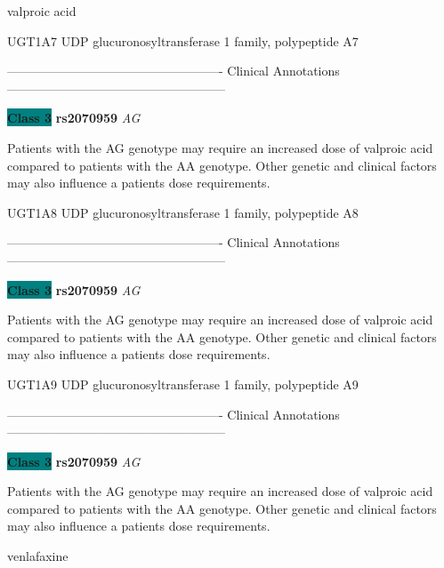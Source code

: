 \documentclass{resume} %
\begin{document}
\begin{rSection}{ valproic acid }
\begin{rSubsection}{ UGT1A7 }{ UDP glucuronosyltransferase 1 family, polypeptide A7 }{}{}
\item[] ---------------------------------------------------- Clinical Annotations -----------------------------------------------------\newline
\item \textbf{\colorbox{teal} {Class 3}} \textbf{ rs2070959 } \textit{ AG }
\item[] Patients with the AG genotype may require an increased dose of valproic acid compared to patients with the AA genotype. Other genetic and clinical factors may also influence a patients dose requirements.
\end{rSubsection}\begin{rSubsection}{ UGT1A8 }{ UDP glucuronosyltransferase 1 family, polypeptide A8 }{}{}
\item[]

\item[] ---------------------------------------------------- Clinical Annotations -----------------------------------------------------\newline
\item \textbf{\colorbox{teal} {Class 3}} \textbf{ rs2070959 } \textit{ AG }
\item[] Patients with the AG genotype may require an increased dose of valproic acid compared to patients with the AA genotype. Other genetic and clinical factors may also influence a patients dose requirements.
\end{rSubsection}\begin{rSubsection}{ UGT1A9 }{ UDP glucuronosyltransferase 1 family, polypeptide A9 }{}{}
\item[]

\item[] ---------------------------------------------------- Clinical Annotations -----------------------------------------------------\newline
\item \textbf{\colorbox{teal} {Class 3}} \textbf{ rs2070959 } \textit{ AG }
\item[] Patients with the AG genotype may require an increased dose of valproic acid compared to patients with the AA genotype. Other genetic and clinical factors may also influence a patients dose requirements.
\end{rSubsection}

\end{rSection}\begin{rSection}{ venlafaxine }
\item[]


\end{rSection}
\end{document}
